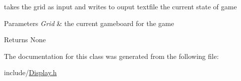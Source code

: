 takes the grid as input and writes to ouput textfile the current state of game 
\begin{DoxyParams}{Parameters}
{\em Grid} & the current gameboard for the game \\
\hline
\end{DoxyParams}
\begin{DoxyReturn}{Returns}
None 
\end{DoxyReturn}


The documentation for this class was generated from the following file\+:\begin{DoxyCompactItemize}
\item 
include/\hyperlink{_display_8h}{Display.\+h}\end{DoxyCompactItemize}
